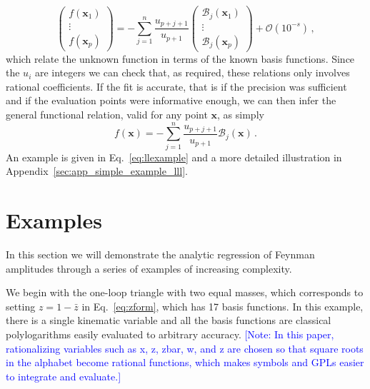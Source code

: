 \documentclass[a4paper,11pt]{article}
\makeatletter
\def\textcolor#1#{\kg@textcolor{#1}}
\newcommand{\zb}{\bar{z}}
\makeatother
\begin{document}
\begin{equation}
 \begin{pmatrix}
        f(\mathbf{x}_1) \\
        \vdots\\
        f(\mathbf{x}_p) 
    \end{pmatrix} = -   \sum_{j=1}^{n} \frac{u_{p+j+1}}{u_{p+1}} \begin{pmatrix}
        \mathcal{B}_j(\mathbf{x}_1) \\
        \vdots\\
        \mathcal{B}_j(\mathbf{x}_p)
    \end{pmatrix} + \mathcal{O}(10^{-s})\,,
\end{equation}
    which relate the unknown function in terms of the known basis functions. Since the $u_i$ are integers we can check that, as required, these relations only involves rational coefficients. If the fit is accurate, that is if the precision was sufficient and if the evaluation points were informative enough, we can then infer the general functional relation, valid for any point $\mathbf{x}$, as simply
\begin{equation}
    f(\mathbf{x})= - \sum_{j=1}^{n} \frac{u_{p+j+1}}{u_{p+1}} \mathcal{B}_j(\mathbf{x}) \,.
\end{equation}
An example is given in Eq.~\eqref{eq:llexample} and a more detailed illustration in Appendix~\ref{sec:app_simple_example_lll}.

\section{Examples}\label{sec:simple_integrals}
In this section we will demonstrate the analytic regression of Feynman amplitudes through a series of examples of increasing complexity.
  
We begin with the one-loop triangle with two equal masses, which corresponds to setting $z=1-\zb$ in Eq.~\eqref{eq:zform}, which has 17 basis functions.  In this example, there is a single kinematic variable and all the basis functions are classical polylogarithms easily evaluated to arbitrary accuracy.
\textcolor{blue}{\small [Note: In this paper, rationalizing variables such as x, z, zbar, w, and z are chosen so that square roots in the alphabet become rational functions, which makes symbols and GPLs easier to integrate and evaluate.]}
\end{document}
